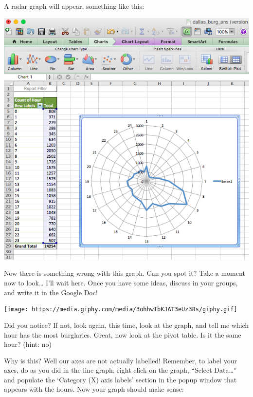 \documentclass[
]{book}
\begin{document}
A radar graph will appear, something like this:

\includegraphics{imgs/wrong_radar.png}

Now there is something wrong with this graph. Can you spot it? Take a moment now to look\ldots{} I'll wait here. Once you have some ideas, discuss in your groups, and write it in the Google Doc!

\texttt{[image: https://media.giphy.com/media/3ohhwIbKJAT3eUz38s/giphy.gif]}

Did you notice? If not, look again, this time, look at the graph, and tell me which hour has the most burglaries. Great, now look at the pivot table. Is it the same hour? (hint: no)

Why is this? Well our axes are not actually labelled! Remember, to label your axes, do as you did in the line graph, right click on the graph, ``Select Data\ldots{}'' and populate the `Category (X) axis labels' section in the popup window that appears with the hours. Now your graph should make sense:
\end{document}
